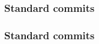 \documentclass{beamer}
\begin{document}
    \begin{frame}
        \frametitle{Standard commits}
        \begin{figure}[H]
            \centering
            \noindent
        \end{figure}
    \end{frame}
    \begin{frame}
        \frametitle{Standard commits}
        \begin{figure}[H]
            \centering
            \noindent
        \end{figure}
    \end{frame}
\end{document}
